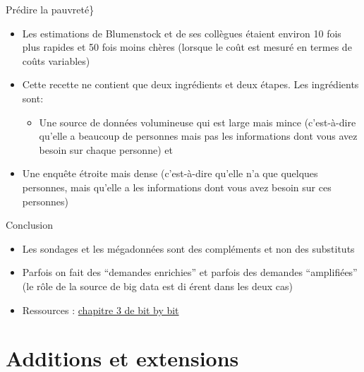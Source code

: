 \documentclass[
  ignorenonframetext,
]{beamer}
\providecommand{\tightlist}{%
  \setlength{\itemsep}{0pt}\setlength{\parskip}{0pt}}
\begin{document}
\begin{frame}{Prédire la pauvreté\}}
\protect\hypertarget{pruxe9dire-la-pauvretuxe9-5}{}

\begin{itemize}
\tightlist
\item
  Les estimations de Blumenstock et de ses collègues étaient environ 10
  fois plus rapides et 50 fois moins chères (lorsque le coût est mesuré
  en termes de coûts variables)
\item
  Cette recette ne contient que deux ingrédients et deux étapes. Les
  ingrédients sont:

  \begin{itemize}
  \tightlist
  \item
    Une source de données volumineuse qui est large mais mince
    (c'est-à-dire qu'elle a beaucoup de personnes mais pas les
    informations dont vous avez besoin sur chaque personne) et
  \end{itemize}
\item
  Une enquête étroite mais dense (c'est-à-dire qu'elle n'a que quelques
  personnes, mais qu'elle a les informations dont vous avez besoin sur
  ces personnes)
\end{itemize}

\end{frame}

\begin{frame}{Conclusion}
\protect\hypertarget{conclusion-3}{}

\begin{itemize}
\tightlist
\item
  Les sondages et les mégadonnées sont des compléments et non des
  substituts
\item
  Parfois on fait des ``demandes enrichies'' et parfois des demandes
  ``amplifiées'' (le rôle de la source de big data est di érent dans les
  deux cas)
\item
  Ressources :
  \href{https://www.bitbybitbook.com/en/1st-ed/asking-questions/}{chapitre
  3 de bit by bit}
\end{itemize}

\end{frame}

\hypertarget{additions-et-extensions}{%
\section{Additions et extensions}\label{additions-et-extensions}}
\end{document}
